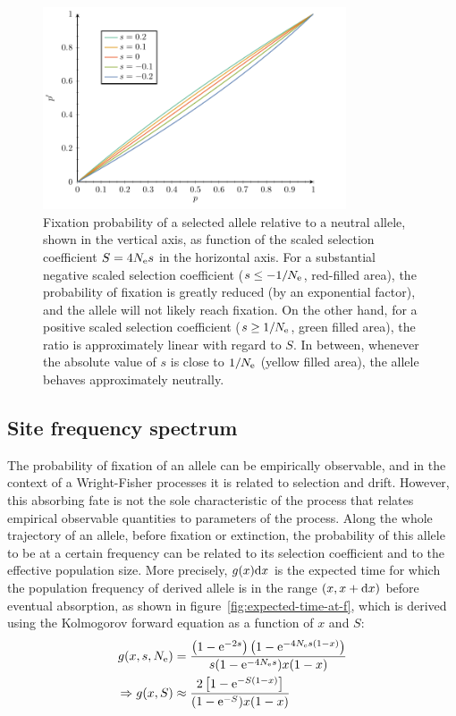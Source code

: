 \begin{figure}[H]
    \centering
    \includegraphics[width=0.8\textwidth, page=2] {figures.pdf}
    \caption[Relative fixation probability]{
    Fixation probability of a selected allele relative to a neutral allele, shown in the vertical axis, as function of the scaled selection coefficient $S=4 N_{\text{e}} s$ in the horizontal axis.
    For a substantial negative scaled selection coefficient ($s \leq -1/N_{\text{e}}$, red-filled area), the probability of fixation is greatly reduced (by an exponential factor), and the allele will not likely reach fixation.
    On the other hand, for a positive scaled selection coefficient ($s \geq 1 / N_{\text{e}}$, green filled area), the ratio is approximately linear with regard to $S$.
    In between, whenever the absolute value of $s$ is close to $1 / N_{\text{e}}$ (yellow filled area), the allele behaves approximately neutrally.}
    \label{fig:relative-fixation-probability}
\end{figure}


\subsection{Site frequency spectrum}
The probability of fixation of an allele can be empirically observable, and in the context of a Wright-Fisher processes it is related to selection and drift.
However, this absorbing fate is not the sole characteristic of the process that relates empirical observable quantities to parameters of the process.
Along the whole trajectory of an allele, before fixation or extinction, the probability of this allele to be at a certain frequency can be related to its selection coefficient and to the effective population size.
More precisely, $g(x) \mathrm{d} x $ is the expected time for which the population frequency of derived allele is in the range $(x, x+\mathrm{d} x)$ before eventual absorption, as shown in figure~\ref{fig:expected-time-at-f}, which is derived using the Kolmogorov forward equation as a function of $x$ and $S$:
\begin{align}
    g(x, s, N_{\text{e}}) & = \dfrac{\left( 1 - \text{e}^{- 2 s }\right) \left( 1 - \text{e}^{-4 N_{\text{e}} s(1-x)}\right)}{ s (1 - \text{e}^{-4 N_{\text{e}} s})x(1-x)} \\
    \Rightarrow g(x, S) & \approx \dfrac{2 \left[ 1 - \text{e}^{-S(1-x)}\right]}{(1 - \text{e}^{-S})x(1-x)} \label{eq:expected_time}
\end{align}

